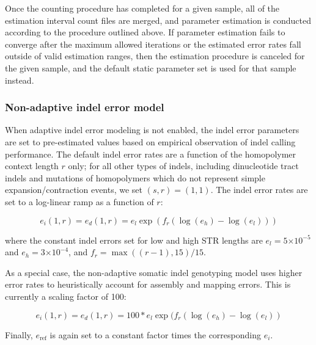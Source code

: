 \documentclass{article}
\newcommand{\e}[1]{\ensuremath{\times 10^{#1}}}
\begin{document}
Once the counting procedure has completed for a given sample, all of the estimation interval count files are merged, and parameter estimation is conducted according to the procedure outlined above. If parameter estimation fails to converge after the maximum allowed iterations or the estimated error rates fall outside of valid estimation ranges, then the estimation procedure is canceled for the given sample, and the default static parameter set is used for that sample instead.

\subsubsection{Non-adaptive indel error model}
\label{sec:non_adaptive_indel_error}
When adaptive indel error modeling is not enabled, the indel error parameters are set to pre-estimated values based on empirical observation of indel calling performance. The default indel error rates are a function of the homopolymer context length $r$ only; for all other types of indels, including dinucleotide tract indels and mutations of homopolymers which do not represent simple expansion/contraction events, we set $(s,r) = (1,1)$. The indel error rates are set to a log-linear ramp as a function of $r$:

\begin{equation*}
e_i(1,r) = e_d(1,r) = e_{l} \exp(f_r(\log(e_{h})-\log(e_{l})))
\end{equation*}

\noindent where the constant indel errors set for low and high STR lengths are $e_{l} = 5\e{-5}$ and $e_{h} = 3\e{-4}$, and $f_r = \max((r-1),15)/15$.

As a special case, the non-adaptive somatic indel genotyping model uses higher error rates to heuristically account for assembly and mapping errors. This is currently a scaling factor of 100: 

\begin{equation*}
e_i(1,r) = e_d(1,r) = 100 * e_{l} \exp(f_r(\log(e_{h})-\log(e_{l}))
\end{equation*}

Finally, $e_{\text{ref}}$ is again set to a constant factor  times the corresponding $e_i$.


\end{document}
